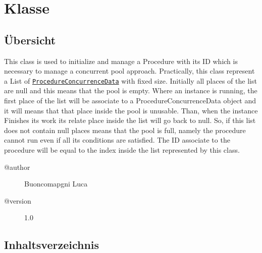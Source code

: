 
\section[ProcedureConcurrenceManager]{Klasse }\label{ontologyFramework.OFProcedureManagment.ProcedureConcurrenceManager-class}
\subsection{Übersicht}
This class is used to initialize and manage a Procedure with its ID which
 is necessary to manage a concurrent pool approach.
 Practically, this class represent a List of \texttt{\hyperlink{ontologyFramework.OFProcedureManagment.ProcedureConcurrenceData-class}{ProcedureConcurrenceData}}
 with fixed size.
 Initially all places of the list are null and this means that the pool
 is empty. Where an instance is running, the first place of the list will
 be associate to a ProcedureConcurrenceData object and it will means
 that that place inside the pool is unusable. Than, when the instance
 Finishes its work its relate place inside the list will go back to null.
 So, if this list does not contain null places means that the pool
 is full, namely the procedure cannot run even if all its conditions
 are satisfied. The ID associate to the procedure will be equal to the index 
 inside the list represented by this class.
\begin{description}
\item[@author] 
Buoncomapgni Luca
\item[@version] 
1.0
\end{description}
\subsection{Inhaltsverzeichnis}
